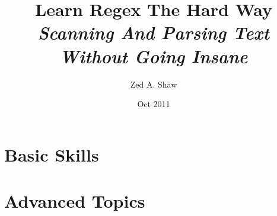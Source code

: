 


\title{
    Learn Regex The Hard Way\\
    \textit{Scanning And Parsing Text Without Going Insane}
}
\author{Zed A. Shaw}
\date{Oct 2011}



\frontmatter

\maketitle

\tableofcontents


\mainmatter



\part{Basic Skills}




























\part{Advanced Topics}




























\appendix



